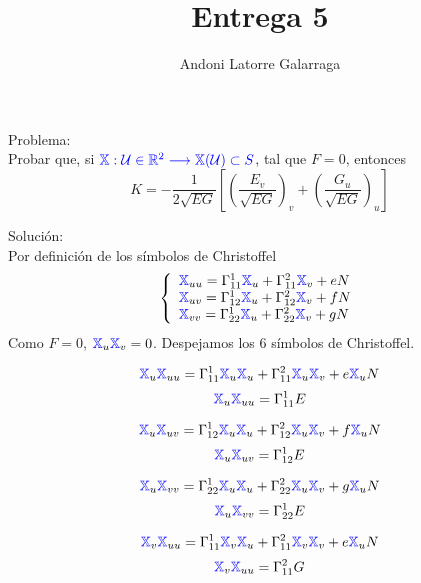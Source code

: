 \documentclass{article}
\title{Entrega 5}
\author{Andoni Latorre Galarraga}
\date{}
\newcommand{\bb}[1]{\mathbb{#1}}
\begin{document}
\maketitle
\textcolor{WildStrawberry}{Problema:}\\
Probar que, si $\textcolor{blue}{\bb{X}:\mathcal{U}\in \bb{R}^2 \longrightarrow \bb{X}(\mathcal{U})\subset S }$, tal que $F = 0$, entonces
$$
K = - \frac{1}{2\sqrt{EG}}\left[ \left(\frac{E_v}{\sqrt{EG}}\right)_v + \left(\frac{G_u}{\sqrt{EG}}\right)_u \right]
$$

\textcolor{WildStrawberry}{Solución:}\\
Por definición de los símbolos de Christoffel
$$
\left\{\begin{array}{l}
    \textcolor{blue}{\bb{X}}_{uu} = \Gamma_{11}^1 \textcolor{blue}{\bb{X}}_u + \Gamma_{11}^2 \textcolor{blue}{\bb{X}}_v + e N \\
    \textcolor{blue}{\bb{X}}_{uv} = \Gamma_{12}^1 \textcolor{blue}{\bb{X}}_u + \Gamma_{12}^2 \textcolor{blue}{\bb{X}}_v + f N \\
    \textcolor{blue}{\bb{X}}_{vv} = \Gamma_{22}^1 \textcolor{blue}{\bb{X}}_u + \Gamma_{22}^2 \textcolor{blue}{\bb{X}}_v + g N
\end{array}\right.
$$
Como $F = 0$, $\textcolor{blue}{\bb{X}}_u \textcolor{blue}{\bb{X}}_v = 0$. Despejamos los 6 símbolos de Christoffel.

$$
\textcolor{blue}{\bb{X}}_u \textcolor{blue}{\bb{X}}_{uu} = \Gamma_{11}^1 \textcolor{blue}{\bb{X}}_u \textcolor{blue}{\bb{X}}_u + \Gamma_{11}^2 \textcolor{blue}{\bb{X}}_u\textcolor{blue}{\bb{X}}_v + e \textcolor{blue}{\bb{X}}_u N
$$
$$
\textcolor{blue}{\bb{X}}_u \textcolor{blue}{\bb{X}}_{uu} = \Gamma_{11}^1 E
$$

$$
\textcolor{blue}{\bb{X}}_u \textcolor{blue}{\bb{X}}_{uv} = \Gamma_{12}^1 \textcolor{blue}{\bb{X}}_u \textcolor{blue}{\bb{X}}_u + \Gamma_{12}^2 \textcolor{blue}{\bb{X}}_u\textcolor{blue}{\bb{X}}_v + f \textcolor{blue}{\bb{X}}_u N
$$
$$
\textcolor{blue}{\bb{X}}_u \textcolor{blue}{\bb{X}}_{uv} = \Gamma_{12}^1 E
$$

$$
\textcolor{blue}{\bb{X}}_u \textcolor{blue}{\bb{X}}_{vv} = \Gamma_{22}^1 \textcolor{blue}{\bb{X}}_u \textcolor{blue}{\bb{X}}_u + \Gamma_{22}^2 \textcolor{blue}{\bb{X}}_u\textcolor{blue}{\bb{X}}_v + g \textcolor{blue}{\bb{X}}_u N
$$
$$
\textcolor{blue}{\bb{X}}_u \textcolor{blue}{\bb{X}}_{vv} = \Gamma_{22}^1 E
$$

$$
\textcolor{blue}{\bb{X}}_v \textcolor{blue}{\bb{X}}_{uu} = \Gamma_{11}^1 \textcolor{blue}{\bb{X}}_v \textcolor{blue}{\bb{X}}_u + \Gamma_{11}^2 \textcolor{blue}{\bb{X}}_v\textcolor{blue}{\bb{X}}_v + e \textcolor{blue}{\bb{X}}_u N
$$
$$
\textcolor{blue}{\bb{X}}_v \textcolor{blue}{\bb{X}}_{uu} = \Gamma_{11}^2 G
$$
\end{document}
